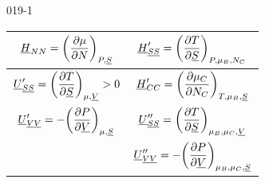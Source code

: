 \begin{mitframe}{019-1}
\begin{longtable}{ | c | c | }
    $\uline{\enthalpy}_{\nummoles\nummoles} = \bigg(\dfrac{\partial\chempot}{\partial\nummoles}\bigg)_{\p,\uline{\entropy}}$ & $\uline{\enthalpy}_{\uline{\entropy} \uline{\entropy}}^{\prime} = \bigg(\dfrac{\partial\Temp}{\partial\uline{\entropy}}\bigg)_{\p,\chempot_{\exergy},\nummoles_{\conc}}$\\ \hline   
    
    $\uline{\intenergy}_{\uline{\entropy} \uline{\entropy}}^{\prime} =\bigg(\dfrac{\partial\Temp}{\partial\uline{\entropy}}\bigg)_{\chempot,\uline{\vol}} > 0$ & $\uline{\enthalpy}_{\conc\conc}^{\prime} = \bigg(\dfrac{\partial\chempot_{\conc}}{\partial\nummoles_{\conc}}\bigg)_{\Temp,\chempot_{\exergy},\uline{\entropy}}$  \\ \hline   
    
    $\uline{\intenergy}_{\uline{\vol} \uline{\vol}}^{\prime} = -\bigg(\dfrac{\partial\p}{\partial\uline{\vol}}\bigg)_{\chempot,\uline{\entropy}}$ & $\uline{\intenergy}_{\uline{\entropy} \uline{\entropy}}^{\prime\prime} = \bigg(\dfrac{\partial\Temp}{\partial\uline{\entropy}}\bigg)_{\chempot_{\exergy},\chempot_{\conc},\uline{\vol}}$ \\ \hline   
    
     & $\uline{\intenergy}_{\uline{\vol} \uline{\vol}}^{\prime\prime} = -\bigg(\dfrac{\partial\p}{\partial\uline{\vol}}\bigg)_{\chempot_{\exergy},\chempot_{\conc},\uline{\entropy}}$ \\ \hline   
 
\end{longtable}		

\end{mitframe}
